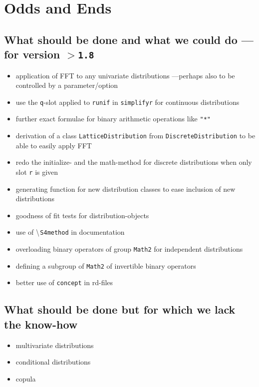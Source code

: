 \documentclass[11pt]{article}
\newcommand{\code}[1]{{\tt #1}}
\newcommand{\pkgversion}{{\tt 1.8}}
\begin{document}
\section{Odds and Ends}
\subsection[What should be done and what we could do]{What should be done and what we could do ---for version $>$\pkgversion}
\begin{itemize}
\item application of FFT to any univariate distributions ---perhaps also to be controlled
by a parameter/option
\item use the \code{q}-slot applied to \code{runif} in \code{simplifyr} for continuous distributions
\item further exact formulae for binary arithmetic operations like \code{"*"}
\item derivation of a class \code{LatticeDistribution} from \code{DiscreteDistribution} to be able to easily apply FFT
\item redo the initialize- and the math-method for discrete distributions when only slot \code{r} is given
\item generating function for new distribution classes to ease inclusion of new distributions
\item goodness of fit tests for distribution-objects
\item use of $\tt \backslash$\code{S4method} in documentation
\item overloading binary operators of group \code{Math2} for independent distributions
\item defining a subgroup of \code{Math2} of invertible binary operators
\item better use of \code{concept} in rd-files
\end{itemize}
\subsection{What should be done but for which we lack the know-how}
\begin{itemize}
  \item multivariate distributions
  \item conditional distributions
  \item copula
\end{itemize}
%
\end{document}
